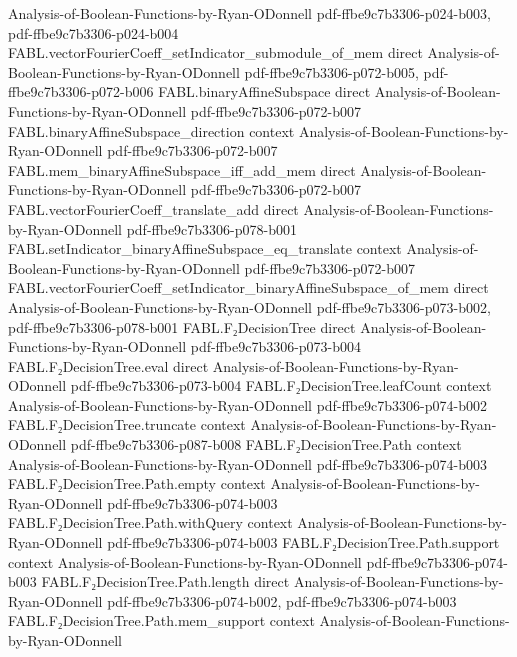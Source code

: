 \begin{theorem}
  {Analysis-of-Boolean-Functions-by-Ryan-ODonnell}
  {pdf-ffbe9c7b3306-p024-b003,
    pdf-ffbe9c7b3306-p024-b004}
\proofstep
  {FABL.vectorFourierCoeff_setIndicator_submodule_of_mem}
  {direct}
  {Analysis-of-Boolean-Functions-by-Ryan-ODonnell}
  {pdf-ffbe9c7b3306-p072-b005,
    pdf-ffbe9c7b3306-p072-b006}
\proofstep
  {FABL.binaryAffineSubspace}
  {direct}
  {Analysis-of-Boolean-Functions-by-Ryan-ODonnell}
  {pdf-ffbe9c7b3306-p072-b007}
\proofstep
  {FABL.binaryAffineSubspace_direction}
  {context}
  {Analysis-of-Boolean-Functions-by-Ryan-ODonnell}
  {pdf-ffbe9c7b3306-p072-b007}
\proofstep
  {FABL.mem_binaryAffineSubspace_iff_add_mem}
  {direct}
  {Analysis-of-Boolean-Functions-by-Ryan-ODonnell}
  {pdf-ffbe9c7b3306-p072-b007}
\proofstep
  {FABL.vectorFourierCoeff_translate_add}
  {direct}
  {Analysis-of-Boolean-Functions-by-Ryan-ODonnell}
  {pdf-ffbe9c7b3306-p078-b001}
\proofstep
  {FABL.setIndicator_binaryAffineSubspace_eq_translate}
  {context}
  {Analysis-of-Boolean-Functions-by-Ryan-ODonnell}
  {pdf-ffbe9c7b3306-p072-b007}
\proofstep
  {FABL.vectorFourierCoeff_setIndicator_binaryAffineSubspace_of_mem}
  {direct}
  {Analysis-of-Boolean-Functions-by-Ryan-ODonnell}
  {pdf-ffbe9c7b3306-p073-b002,
    pdf-ffbe9c7b3306-p078-b001}
\proofstep
  {FABL.F₂DecisionTree}
  {direct}
  {Analysis-of-Boolean-Functions-by-Ryan-ODonnell}
  {pdf-ffbe9c7b3306-p073-b004}
\proofstep
  {FABL.F₂DecisionTree.eval}
  {direct}
  {Analysis-of-Boolean-Functions-by-Ryan-ODonnell}
  {pdf-ffbe9c7b3306-p073-b004}
\proofstep
  {FABL.F₂DecisionTree.leafCount}
  {context}
  {Analysis-of-Boolean-Functions-by-Ryan-ODonnell}
  {pdf-ffbe9c7b3306-p074-b002}
\proofstep
  {FABL.F₂DecisionTree.truncate}
  {context}
  {Analysis-of-Boolean-Functions-by-Ryan-ODonnell}
  {pdf-ffbe9c7b3306-p087-b008}
\proofstep
  {FABL.F₂DecisionTree.Path}
  {context}
  {Analysis-of-Boolean-Functions-by-Ryan-ODonnell}
  {pdf-ffbe9c7b3306-p074-b003}
\proofstep
  {FABL.F₂DecisionTree.Path.empty}
  {context}
  {Analysis-of-Boolean-Functions-by-Ryan-ODonnell}
  {pdf-ffbe9c7b3306-p074-b003}
\proofstep
  {FABL.F₂DecisionTree.Path.withQuery}
  {context}
  {Analysis-of-Boolean-Functions-by-Ryan-ODonnell}
  {pdf-ffbe9c7b3306-p074-b003}
\proofstep
  {FABL.F₂DecisionTree.Path.support}
  {context}
  {Analysis-of-Boolean-Functions-by-Ryan-ODonnell}
  {pdf-ffbe9c7b3306-p074-b003}
\proofstep
  {FABL.F₂DecisionTree.Path.length}
  {direct}
  {Analysis-of-Boolean-Functions-by-Ryan-ODonnell}
  {pdf-ffbe9c7b3306-p074-b002,
    pdf-ffbe9c7b3306-p074-b003}
\proofstep
  {FABL.F₂DecisionTree.Path.mem_support}
  {context}
  {Analysis-of-Boolean-Functions-by-Ryan-ODonnell}

\end{theorem}
